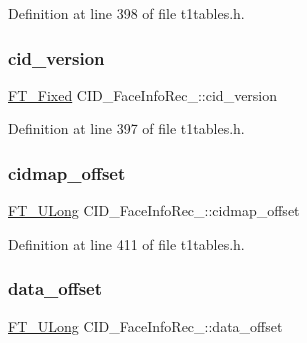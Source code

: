 Definition at line 398 of file t1tables.\+h.

\mbox{\label{struct_c_i_d___face_info_rec___af37ddd46827a8e45fbcce60f43e2f61c}} 
\subsubsection{\texorpdfstring{cid\_version}{cid\_version}}
{\footnotesize\ttfamily \mbox{\hyperlink{fttypes_8h_a5f5a679cc09f758efdd0d1c5feed3c3d}{F\+T\+\_\+\+Fixed}} C\+I\+D\+\_\+\+Face\+Info\+Rec\+\_\+\+::cid\+\_\+version}



Definition at line 397 of file t1tables.\+h.

\mbox{\label{struct_c_i_d___face_info_rec___a8c72c1a90704c7e3519ca182613fec5a}} 
\subsubsection{\texorpdfstring{cidmap\_offset}{cidmap\_offset}}
{\footnotesize\ttfamily \mbox{\hyperlink{fttypes_8h_a4fac88bdba78eb76b505efa6e4fbf3f5}{F\+T\+\_\+\+U\+Long}} C\+I\+D\+\_\+\+Face\+Info\+Rec\+\_\+\+::cidmap\+\_\+offset}



Definition at line 411 of file t1tables.\+h.

\mbox{\label{struct_c_i_d___face_info_rec___a31e8fb9ac2b0c1fa63220e5e07aeea97}} 
\subsubsection{\texorpdfstring{data\_offset}{data\_offset}}
{\footnotesize\ttfamily \mbox{\hyperlink{fttypes_8h_a4fac88bdba78eb76b505efa6e4fbf3f5}{F\+T\+\_\+\+U\+Long}} C\+I\+D\+\_\+\+Face\+Info\+Rec\+\_\+\+::data\+\_\+offset}



